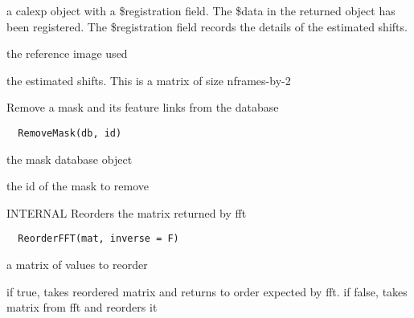 \documentclass[a4paper]{book}
\begin{document}
%
\begin{Value}
a calexp object with a \bsl{}\$registration field.  The \bsl{}\$data
in the returned object has been registered.  The
\bsl{}\$registration field records the details of the estimated
shifts.  \begin{ldescription}
\item[\code{refimg}] the reference image used
\item[\code{mpars}] the estimated shifts. This is a matrix of
size nframes-by-2
\end{ldescription}
\end{Value}
%
\begin{Description}\relax
Remove a mask and its feature links from the database
\end{Description}
%
\begin{Usage}
\begin{verbatim}
  RemoveMask(db, id)
\end{verbatim}
\end{Usage}
%
\begin{Arguments}
\begin{ldescription}
\item[\code{db}] the mask database object

\item[\code{id}] the id of the mask to remove
\end{ldescription}
\end{Arguments}
%
\begin{Description}\relax
INTERNAL Reorders the matrix returned by fft
\end{Description}
%
\begin{Usage}
\begin{verbatim}
  ReorderFFT(mat, inverse = F)
\end{verbatim}
\end{Usage}
%
\begin{Arguments}
\begin{ldescription}
\item[\code{mat}] a matrix of values to reorder

\item[\code{inverse}] if true, takes reordered matrix and
returns to order expected by fft. if false, takes matrix
from fft and reorders it
\end{ldescription}
\end{Arguments}
\end{document}
